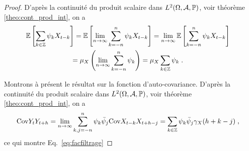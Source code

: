 \begin{proof}\smartqed
D'apr\`es la continuit\'e du produit scalaire dans $L^2(\Omega,\mathcal{A},\mathbb{P})$, voir th\'eor\`eme \ref{theo:cont_prod_int}, on a
\begin{multline*}
{\mathbb E}\left[ \sum_{k\in\mathbb{Z}}\psi_k X_{t-k} \right]={\mathbb E}\left[ \lim_{n\to\infty}\sum_{k=-n}^n \psi_k X_{t-k} \right]
=\lim_{n\to\infty}{\mathbb E}\left[ \sum_{k=-n}^n \psi_k X_{t-k} \right]\\
=\mu_X \left(\lim_{n\to\infty}\sum_{k=-n}^n \psi_k \right)
=\mu_X \sum_{k\in\mathbb{Z}} \psi_k\; .
\end{multline*}

Montrons \`a pr\'esent le r\'esultat sur la fonction d'auto-covariance.
D'apr\`es la continuit\'e du produit scalaire dans $L^2(\Omega,\mathcal{A},\mathbb{P})$, voir th\'eor\`eme \ref{theo:cont_prod_int}, on a
\begin{equation*}
{\rm Cov}{Y_t}{Y_{t+h}} =\lim_{n\to\infty}\sum_{k,j=-n}^n\psi_k \bar{\psi}_j{\rm Cov}{X_{t-k}}{X_{t+h-j}}
= \sum_{k\in\mathbb{Z}}\psi_k \bar{\psi}_j\gamma_X(h+k-j)\; ,
\end{equation*}
ce qui montre Eq.~\eqref{eq:facfiltrage}


\end{proof}
